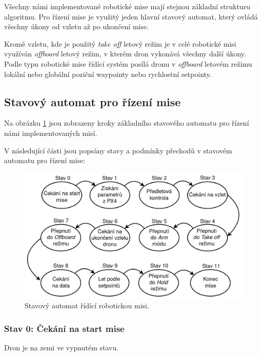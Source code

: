 Všechny námi implementované robotické mise mají stejnou základní strukturu algoritmu. Pro řízení mise je využitý jeden hlavní stavový automat, který ovládá všechny úkony od vzletu až po ukončení mise.

Kromě vzletu, kde je použitý \textit{take off} letový režim je v celé robotické misi využíván \textit{offboard} letový režim, v kterém dron vykonává všechny další úkony. Podle typu robotické mise řídící systém posílá dronu v \textit{offboard} letovém režimu lokální nebo globální poziční waypointy nebo rychlostní setpointy.

\subsection{Stavový automat pro řízení mise}

Na obrázku \ref{fig:MISE2} jsou zobrazeny kroky základního stavového automatu pro řízení námi implementovaných misí.

V následující části jsou popsány stavy a podmínky přechodů v stavovém automatu pro řízení mise:

\begin{figure}[!ht]
  \begin{center}
    \includegraphics[scale=0.32]{obrazky/MISEAUTOMAT}
  \end{center}
  \caption[Stavový automat řídící robotickou misi]{Stavový automat řídící robotickou misi.}
  \label{fig:MISE2}
\end{figure}

\subsubsection{Stav 0: Čekání na start mise}

Dron je na zemi ve vypnutém stavu.


